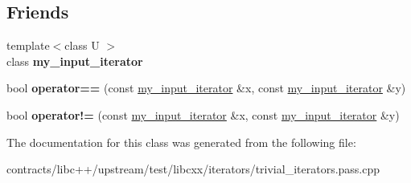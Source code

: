 \subsection*{Friends}
\begin{DoxyCompactItemize}
\item 
\mbox{\label{classmy__input__iterator_a7849753d8ff033bb2c6b649c8e1faefe}} 
{\footnotesize template$<$class U $>$ }\\class {\bfseries my\+\_\+input\+\_\+iterator}
\item 
\mbox{\label{classmy__input__iterator_af09e3c2ecc72dd36a83520ec2ad96046}} 
bool {\bfseries operator==} (const \mbox{\hyperlink{classmy__input__iterator}{my\+\_\+input\+\_\+iterator}} \&x, const \mbox{\hyperlink{classmy__input__iterator}{my\+\_\+input\+\_\+iterator}} \&y)
\item 
\mbox{\label{classmy__input__iterator_a5ad7333d35af966ac4a6d4b13d90acbe}} 
bool {\bfseries operator!=} (const \mbox{\hyperlink{classmy__input__iterator}{my\+\_\+input\+\_\+iterator}} \&x, const \mbox{\hyperlink{classmy__input__iterator}{my\+\_\+input\+\_\+iterator}} \&y)
\end{DoxyCompactItemize}


The documentation for this class was generated from the following file\+:\begin{DoxyCompactItemize}
\item 
contracts/libc++/upstream/test/libcxx/iterators/trivial\+\_\+iterators.\+pass.\+cpp\end{DoxyCompactItemize}
